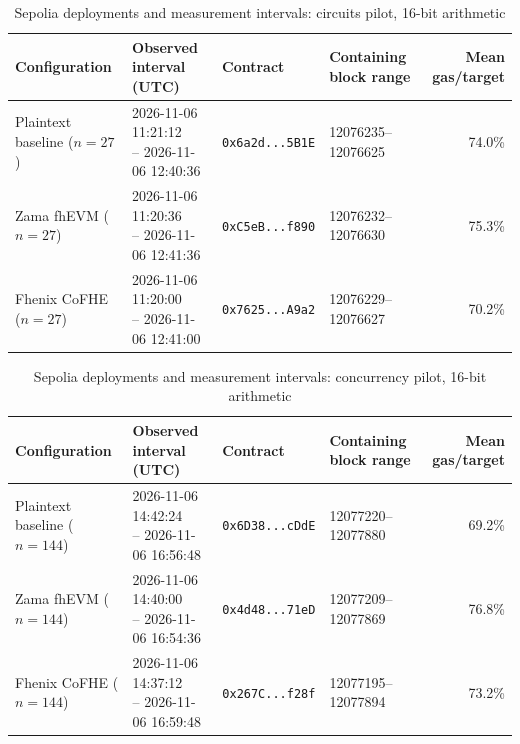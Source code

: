 \begin{table}[!t]
\caption{Sepolia deployments and measurement intervals: circuits pilot, 16-bit arithmetic}
\label{tab:sepolia-experiment-deployments-circuits-euint16}
\centering
\footnotesize
\setlength{\tabcolsep}{4pt}
\begin{tabular}{|l|l|l|l|r|}
\hline
\textbf{Configuration} &
\textbf{Observed interval (UTC)} &
\textbf{Contract} &
\textbf{Containing block range} &
\textbf{Mean gas/target} \\
\hline
Plaintext baseline (\(n=27\)) &
\shortstack[l]{2026-11-06 11:21:12 \\ -- 2026-11-06 12:40:36} &
\texttt{0x6a2d...5B1E} &
12076235--12076625 &
74.0\% \\
\hline
Zama fhEVM (\(n=27\)) &
\shortstack[l]{2026-11-06 11:20:36 \\ -- 2026-11-06 12:41:36} &
\texttt{0xC5eB...f890} &
12076232--12076630 &
75.3\% \\
\hline
Fhenix CoFHE (\(n=27\)) &
\shortstack[l]{2026-11-06 11:20:00 \\ -- 2026-11-06 12:41:00} &
\texttt{0x7625...A9a2} &
12076229--12076627 &
70.2\% \\
\hline
\end{tabular}
\end{table}

\begin{table}[!t]
\caption{Sepolia deployments and measurement intervals: concurrency pilot, 16-bit arithmetic}
\label{tab:sepolia-experiment-deployments-concurrency-euint16}
\centering
\footnotesize
\setlength{\tabcolsep}{4pt}
\begin{tabular}{|l|l|l|l|r|}
\hline
\textbf{Configuration} &
\textbf{Observed interval (UTC)} &
\textbf{Contract} &
\textbf{Containing block range} &
\textbf{Mean gas/target} \\
\hline
Plaintext baseline (\(n=144\)) &
\shortstack[l]{2026-11-06 14:42:24 \\ -- 2026-11-06 16:56:48} &
\texttt{0x6D38...cDdE} &
12077220--12077880 &
69.2\% \\
\hline
Zama fhEVM (\(n=144\)) &
\shortstack[l]{2026-11-06 14:40:00 \\ -- 2026-11-06 16:54:36} &
\texttt{0x4d48...71eD} &
12077209--12077869 &
76.8\% \\
\hline
Fhenix CoFHE (\(n=144\)) &
\shortstack[l]{2026-11-06 14:37:12 \\ -- 2026-11-06 16:59:48} &
\texttt{0x267C...f28f} &
12077195--12077894 &
73.2\% \\
\hline
\end{tabular}
\end{table}

